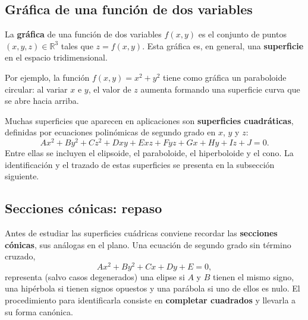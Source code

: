 \subsection{Gráfica de una función de dos variables}

La \textbf{gráfica} de una función de dos variables $f(x,y)$ es el
conjunto de puntos $(x,y,z) \in \mathbb{R}^3$ tales que
$z = f(x,y)$. Esta gráfica es, en general, una \textbf{superficie} en
el espacio tridimensional.

Por ejemplo, la función $f(x,y) = x^2 + y^2$ tiene como gráfica un
paraboloide circular: al variar $x$ e $y$, el valor de $z$ aumenta
formando una superficie curva que se abre hacia arriba.

\begin{rem}
Muchas superficies que aparecen en aplicaciones son \textbf{superficies
cuadráticas}, definidas por ecuaciones polinómicas de segundo grado en
$x$, $y$ y $z$:
\[
Ax^2 + By^2 + Cz^2 + Dxy + Exz + Fyz + Gx + Hy + Iz + J = 0.
\]
Entre ellas se incluyen el elipsoide, el paraboloide, el hiperboloide y
el cono. La identificación y el trazado de estas superficies se
presenta en la subsección siguiente.
\end{rem}

\subsection{Secciones cónicas: repaso}

Antes de estudiar las superficies cuádricas conviene recordar las
\textbf{secciones cónicas}, sus análogas en el plano. Una ecuación de
segundo grado sin término cruzado,
\[
  Ax^2+By^2+Cx+Dy+E=0,
\]
representa (salvo casos degenerados) una elipse si $A$ y $B$ tienen el mismo
signo, una hipérbola si tienen signos opuestos y una parábola si uno de ellos
es nulo. El procedimiento para identificarla consiste en \textbf{completar
cuadrados} y llevarla a su forma canónica.

